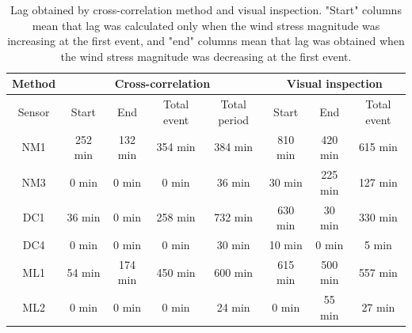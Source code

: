\documentclass[tesis.tex]{subfiles}
\begin{document}
\begin{table}[]
    \centering
    \caption{Lag obtained by cross-correlation method and visual inspection. "Start" columns mean that lag was calculated only when the wind stress magnitude was increasing at the first event, and "end" columns mean that lag was obtained when the wind stress magnitude was decreasing at the first event.}
    \begin{tabular}{|c|cccc|ccc|}
    \hline
    Method &
      \multicolumn{4}{c|}{Cross-correlation} &
      \multicolumn{3}{c|}{Visual inspection} \\ \hline
    Sensor &
      \multicolumn{1}{c|}{Start} &
      \multicolumn{1}{c|}{End} &
      \multicolumn{1}{c|}{Total event} &
      Total period &
      \multicolumn{1}{c|}{Start} &
      \multicolumn{1}{c|}{End} &
      Total event \\ \hline
    NM1 &
      \multicolumn{1}{c|}{252 min} &
      \multicolumn{1}{c|}{132 min} &
      \multicolumn{1}{c|}{354 min} &
      384 min &
      \multicolumn{1}{c|}{810 min} &
      \multicolumn{1}{c|}{420 min} &
      615 min \\ \hline
    NM3 &
      \multicolumn{1}{c|}{0 min} &
      \multicolumn{1}{c|}{0 min} &
      \multicolumn{1}{c|}{0 min} &
      36 min &
      \multicolumn{1}{c|}{30 min} &
      \multicolumn{1}{c|}{225 min} &
      127 min \\ \hline
    DC1 &
      \multicolumn{1}{c|}{36 min} &
      \multicolumn{1}{c|}{0 min} &
      \multicolumn{1}{c|}{258 min} &
      732 min &
      \multicolumn{1}{c|}{630 min} &
      \multicolumn{1}{c|}{30 min} &
      330 min \\ \hline
    DC4 &
      \multicolumn{1}{c|}{0 min} &
      \multicolumn{1}{c|}{0 min} &
      \multicolumn{1}{c|}{0 min} &
      30 min &
      \multicolumn{1}{c|}{10 min} &
      \multicolumn{1}{c|}{0 min} &
      5 min \\ \hline
    ML1 &
      \multicolumn{1}{c|}{54 min} &
      \multicolumn{1}{c|}{174 min} &
      \multicolumn{1}{c|}{450 min} &
      600 min &
      \multicolumn{1}{c|}{615 min} &
      \multicolumn{1}{c|}{500 min} &
      557 min \\ \hline
    ML2 &
      \multicolumn{1}{c|}{0 min} &
      \multicolumn{1}{c|}{0 min} &
      \multicolumn{1}{c|}{0 min} &
      24 min &
      \multicolumn{1}{c|}{0 min} &
      \multicolumn{1}{c|}{55 min} &
      27 min \\ \hline
    \end{tabular}
    \label{tab:lag}
    \end{table}
\end{document}
